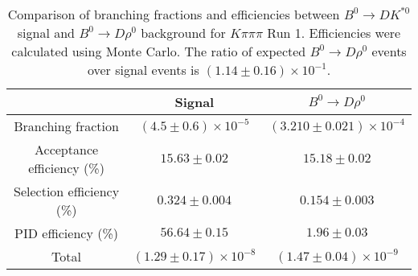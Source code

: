 \begin{table}
    \centering
    \begin{tabular}{ccc}
        \toprule
        & Signal & $B^0 \to D\rho^0$ \\
        \midrule
        Branching fraction & $(4.5 \pm 0.6) \times 10^{-5}$ & $(3.210 \pm 0.021) \times 10^{-4}$ \\
        Acceptance efficiency (\%) & $15.63 \pm 0.02$ & $15.18 \pm 0.02$ \\
        Selection efficiency (\%) & $0.324 \pm 0.004$ & $0.154 \pm 0.003$ \\
        PID efficiency (\%) & $56.64 \pm 0.15$ & $1.96 \pm 0.03$ \\
        \midrule
        Total & $(1.29 \pm 0.17) \times 10^{-8}$ & $(1.47 \pm 0.04) \times 10^{-9}$ \\
        \bottomrule
        \end{tabular}
        \caption{Comparison of branching fractions and efficiencies between $B^0 \to DK^{*0}$ signal and $B^0 \to D\rho^0$ background for $K\pi\pi\pi$ Run 1. Efficiencies were calculated using Monte Carlo. The ratio of expected $B^0 \to D\rho^0$ events over signal events is $(1.14 \pm 0.16) \times 10^{-1}$.}
\label{tab:rho_efficiency_Kpipipi_run1}
\end{table}

